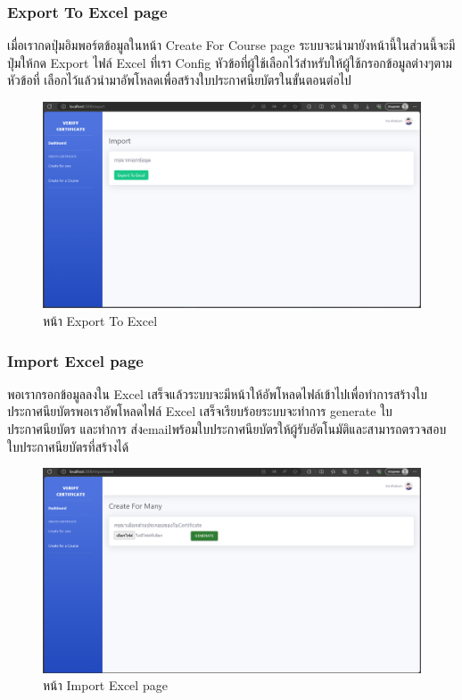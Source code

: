 \subsubsection{Export To Excel page} 
\enskip \enskip \enskip \enskip \enskip
เมื่อเรากดปุ่มอิมพอร์ตข้อมูลในหน้า Create For Course page ระบบจะนำมายังหน้านี้ในส่วนนี้จะมีปุ่มให้กด Export ไฟล์ Excel ที่เรา Config หัวข้อที่ผู้ใช้เลือกไว้สำหรับให้ผู้ใช้กรอกข้อมูลต่างๆตามหัวข้อที่ เลือกไว้แล้วนำมาอัพโหลดเพื่อสร้างใบประกาศนียบัตรในขั้นตอนต่อไป 
\graphicspath{ {./images/} }
\begin{figure}[htbp]
  \centering 
  \includegraphics[scale=0.3]{excel.png}
  \caption[หน้า Export To Excel]{หน้า Export To Excel}
  \label{fig:Export To Excel}
\end{figure}

\subsubsection{Import Excel page} 
\enskip \enskip \enskip \enskip \enskip
พอเรากรอกข้อมูลลงใน Excel เสร็จแล้วระบบจะมีหน้าให้อัพโหลดไฟล์เข้าไปเพื่อทำการสร้างใบ ประกาศนียบัตรพอเราอัพโหลดไฟล์ Excel เสร็จเรียบร้อยระบบจะทำการ generate ใบประกาศนียบัตร และทำการ ส่งemailพร้อมใบประกาศนียบัตรให้ผู้รับอัตโนมัติและสามารถตรวจสอบใบประกาศนียบัตรที่สร้างได้
\graphicspath{ {./images/} }
\begin{figure}[htbp]
  \centering 
  \includegraphics[scale=0.3]{excel2.png}
  \caption[หน้า Import Excel page]{หน้า Import Excel page}
  \label{fig:Import Excel page}
\end{figure}

